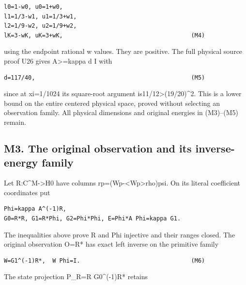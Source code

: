 \documentclass[11pt,a4paper]{article}
\renewcommand{\[}{\begingroup\small\originaldisplaystart}
\renewcommand{\]}{\originaldisplayend\endgroup}
\begin{document}
\begin{verbatim}
l0=1-w0, u0=1+w0,
l1=1/3-w1, u1=1/3+w1,
l2=1/9-w2, u2=1/9+w2,
lK=3-wK, uK=3+wK,                                     (M4)
\end{verbatim}

using the endpoint rational w values. They are positive. The full
physical source proof U26 gives A\textgreater=kappa d I with

\begin{verbatim}
d=117/40,                                             (M5)
\end{verbatim}

since at xi=1/1024 its square-root argument
{i\allowbreak{}s\allowbreak{}1\allowbreak{}1\allowbreak{}/\allowbreak{}1\allowbreak{}2\allowbreak{}\textgreater{}\allowbreak{}(\allowbreak{}1\allowbreak{}9\allowbreak{}/\allowbreak{}2\allowbreak{}0\allowbreak{})\allowbreak{}\textasciicircum{}\allowbreak{}2\allowbreak{}.\allowbreak{}}
This is a lower bound on the entire centered physical space, proved
without selecting an observation family. All physical dimensions and
original energies in (M3)--(M5) remain.

\subsection{M3. The original observation and its inverse-energy
family}\label{m3.-the-original-observation-and-its-inverse-energy-family}

Let R:C\^{}M-\textgreater H0 have columns
{r\allowbreak{}p\allowbreak{}=\allowbreak{}(\allowbreak{}W\allowbreak{}p\allowbreak{}-\allowbreak{}\textless{}\allowbreak{}W\allowbreak{}p\allowbreak{}\textgreater{}\allowbreak{}r\allowbreak{}h\allowbreak{}o\allowbreak{})\allowbreak{}p\allowbreak{}s\allowbreak{}i\allowbreak{}.\allowbreak{}}
On its literal coefficient coordinates put

\begin{verbatim}
Phi=kappa A^(-1)R,
G0=R*R, G1=R*Phi, G2=Phi*Phi, E=Phi*A Phi=kappa G1.
\end{verbatim}

The inequalities above prove R and Phi injective and their ranges
closed. The original observation O=R* has exact left inverse on the
primitive family

\begin{verbatim}
W=G1^(-1)R*,  W Phi=I.                                (M6)
\end{verbatim}

The state projection P\_R=R G0\^{}(-1)R* retains
\end{document}
